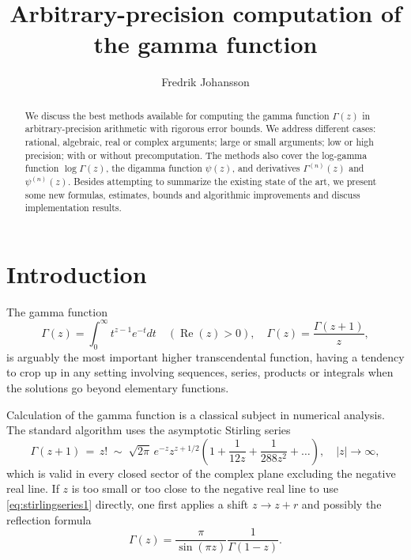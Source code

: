 \documentclass[reqno]{amsart}
\newcommand{\Real}{\operatorname{Re}}
\theoremstyle{definition}
\begin{document}
\title{Arbitrary-precision computation of the gamma function}

\author{Fredrik Johansson}
\address{Inria Bordeaux, 33400 Talence, France}




\begin{abstract}
We discuss the best methods available for computing the gamma function $\Gamma(z)$
in arbitrary-precision arithmetic with rigorous error bounds.
We address different cases: rational, algebraic, real or complex arguments;
large or small arguments; low or high precision;
with or without precomputation.
The methods also cover the log-gamma
function $\log \Gamma(z)$, the digamma function $\psi(z)$,
and derivatives $\Gamma^{(n)}(z)$ and $\psi^{(n)}(z)$.
Besides attempting to summarize the existing state of the art, we present
some new formulas, estimates, bounds and algorithmic improvements and discuss implementation results.
\end{abstract}


\maketitle


\section{Introduction}

The gamma function
\begin{equation}
\label{eq:gammadef}
\Gamma(z) = \int_0^{\infty} t^{z-1} e^{-t} dt \quad (\Real(z) > 0), \quad \Gamma(z) = \frac{\Gamma(z+1)}{z},
\end{equation}
is arguably the most important higher transcendental function,
having a tendency to crop up in any setting involving sequences, series, products or integrals
when the solutions go beyond elementary functions.

Calculation of the gamma function is
a classical subject in numerical analysis.
The standard algorithm
uses the asymptotic Stirling series
\begin{equation}
\Gamma(z+1) \,= \,z! \;\sim \;\sqrt{2 \pi} \, e^{-z} z^{z+1/2} \left(1 + \frac{1}{12 z} + \frac{1}{288 z^2} + \ldots \right), \quad |z| \to \infty,
\label{eq:stirlingseries1}
\end{equation}
which is valid in every closed sector of the complex plane excluding the negative real line.
If $z$ is too small or too close to the negative real line to use \eqref{eq:stirlingseries1} directly,
one first applies a shift $z \to z + r$ and possibly the reflection formula
\begin{equation}
\Gamma\!\left(z\right) = \frac{\pi}{\sin\!\left(\pi z\right)} \frac{1}{\Gamma\!\left(1 - z\right)}.
\label{eq:reflection}
\end{equation}
\end{document}
